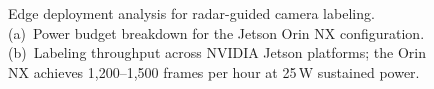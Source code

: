 \begin{figure}[t]

  \caption{Edge deployment analysis for radar-guided camera labeling. (a)~Power budget breakdown for the Jetson Orin NX configuration. (b)~Labeling throughput across NVIDIA Jetson platforms; the Orin NX achieves 1,200--1,500 frames per hour at 25\,W sustained power.}
  \label{fig:edge_power_throughput}
\end{figure}
